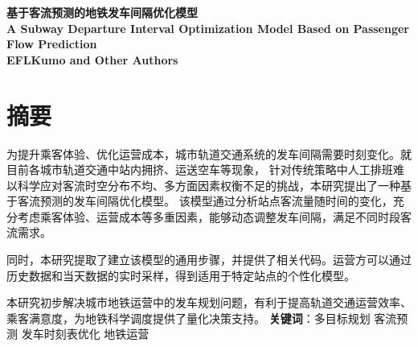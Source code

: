 \thispagestyle{empty}   %

\begin{center}
    \textbf{\fontsize{20}{1.5}基于客流预测的地铁发车间隔优化模型}
    \\
    \textbf{\fontsize{12}{1.5}A Subway Departure Interval Optimization Model Based on Passenger Flow Prediction}
    \\
    \textbf{\fontsize{12}{1.5}EFLKumo and Other Authors}

\end{center}





%
%


\section*{摘要}

为提升乘客体验、优化运营成本，城市轨道交通系统的发车间隔需要时刻变化。就目前各城市轨道交通中站内拥挤、运送空车等现象，
针对传统策略中人工排班难以科学应对客流时空分布不均、多方面因素权衡不足的挑战，本研究提出了一种基于客流预测的发车间隔优化模型。
该模型通过分析站点客流量随时间的变化，充分考虑乘客体验、运营成本等多重因素，能够动态调整发车间隔，满足不同时段客流需求。

同时，本研究提取了建立该模型的通用步骤，并提供了相关代码。运营方可以通过历史数据和当天数据的实时采样，得到适用于特定站点的个性化模型。

本研究初步解决城市地铁运营中的发车规划问题，有利于提高轨道交通运营效率、乘客满意度，为地铁科学调度提供了量化决策支持。\newline
\newline
\textbf{关键词}：多目标规划 \quad 客流预测 \quad 发车时刻表优化 \quad 地铁运营